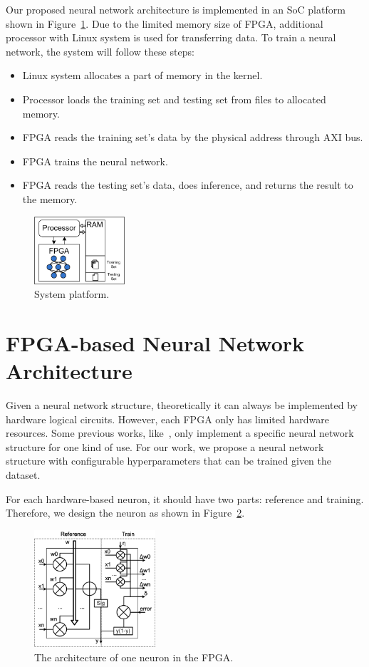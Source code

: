 \documentclass[conference]{IEEEtran}
\begin{document}
Our proposed neural network architecture is implemented in an SoC platform shown in Figure~\ref{fig:sys}. Due to the limited memory size of FPGA, additional processor with Linux system is used for transferring data. To train a neural network, the system will follow these steps:
\begin{itemize}
\item Linux system allocates a part of memory in the kernel.
\item Processor loads the training set and testing set from files to allocated memory.
\item FPGA reads the training set's data by the physical address through AXI bus.
\item FPGA trains the neural network.
\item FPGA reads the testing set's data, does inference, and returns the result to the memory.
\end{itemize}

\begin{figure}[!hbt]
	\centering
	\includegraphics[width=0.3\textwidth]{sys.png}
	\caption{System platform.}
	\label{fig:sys}
\end{figure}

\section{FPGA-based Neural Network Architecture}
\label{sec:fpgann}

Given a neural network structure, theoretically it can always be implemented by hardware logical circuits. However, each FPGA only has limited hardware resources. Some previous works, like~\cite{hytnh17}, only implement a specific neural network structure for one kind of use. For our work, we propose a neural network structure with configurable hyperparameters that can be trained given the dataset. 

For each hardware-based neuron, it should have two parts: reference and training. Therefore, we design the neuron as shown in Figure~\ref{fig:neuron}.

\begin{figure}[!hbt]
	\centering
	\includegraphics[width=0.4\textwidth]{neuron.png}
	\caption{The architecture of one neuron in the FPGA.}
	\label{fig:neuron}
\end{figure}
\end{document}
